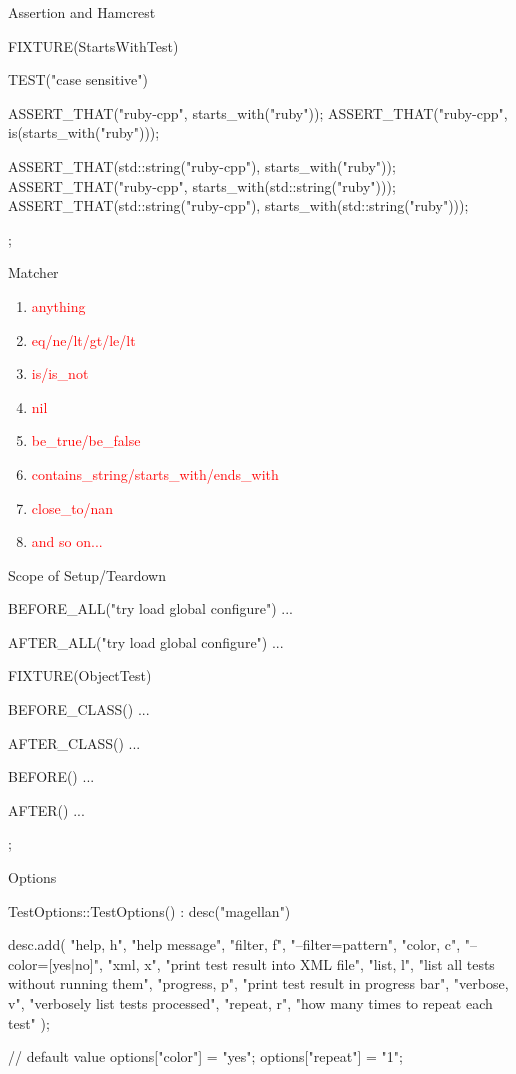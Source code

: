 \begin{frame}[fragile]{Assertion and Hamcrest}
\begin{c++}
FIXTURE(StartsWithTest)
{
    TEST("case sensitive")
    {
        ASSERT_THAT("ruby-cpp", starts_with("ruby"));
        ASSERT_THAT("ruby-cpp", is(starts_with("ruby")));

        ASSERT_THAT(std::string("ruby-cpp"), starts_with("ruby"));
        ASSERT_THAT("ruby-cpp", starts_with(std::string("ruby")));
        ASSERT_THAT(std::string("ruby-cpp"), starts_with(std::string("ruby")));
    }
};
\end{c++}
\end{frame}

\begin{frame}{Matcher}
  \begin{enumerate}
    \item \textcolor{red}{anything}
    \item \textcolor{red}{eq/ne/lt/gt/le/lt}
    \item \textcolor{red}{is/is\_not}
    \item \textcolor{red}{nil}
    \item \textcolor{red}{be\_true/be\_false}
    \item \textcolor{red}{contains\_string/starts\_with/ends\_with}
    \item \textcolor{red}{close\_to/nan}
    \item \textcolor{red}{and so on...}
  \end{enumerate}
\end{frame}

\begin{frame}[fragile]{Scope of Setup/Teardown}
\begin{c++}
BEFORE_ALL("try load global configure")
{ ... }

AFTER_ALL("try load global configure")
{ ... }

FIXTURE(ObjectTest)
{
    BEFORE_CLASS()
    { ... }

    AFTER_CLASS()
    { ... }

    BEFORE()
    { ... }

    AFTER()
    { ... }
};
\end{c++}
\end{frame}

\begin{frame}[fragile]{Options}
\begin{c++}
TestOptions::TestOptions() : desc("magellan")
{
    desc.add({
        {"help,     h",   "help message"},
        {"filter,   f",   "--filter=pattern"},
        {"color,    c",   "--color=[yes|no]"},
        {"xml,      x",   "print test result into XML file"},
        {"list,     l",   "list all tests without running them"},
        {"progress, p",   "print test result in progress bar"},
        {"verbose,  v",   "verbosely list tests processed"},
        {"repeat,   r",   "how many times to repeat each test"}
    });

    // default value
    options["color"]  = "yes";
    options["repeat"] = "1";
}
\end{c++}
\end{frame}

